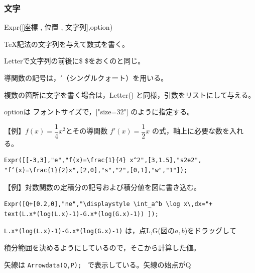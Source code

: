 \documentclass[papersize,a4paper,12pt,uplatex]{jsarticle}
\begin{document}
\subsubsection{文字}
\begin{description}

\vspace{\baselineskip}
\hypertarget{expr}{}
\item[関数]Expr([座標 , 位置 , 文字列],option)
\item[機能]\TeX 記法の文字列を与えて数式を書く。
\item[説明]Letterで文字列の前後に\$ \$をおくのと同じ。

導関数の記号は，$'$（シングルクォート）を用いる。

複数の箇所に文字を書く場合は，Letter() と同様，引数をリストにして与える。

optionは フォントサイズで，["size=32"] のように指定する。

\vspace{\baselineskip}
【例】$f(x)=\dfrac{1}{4} x^2$とその導関数 $f'(x)=\dfrac{1}{2} x$ の式，軸上に必要な数を入れる。
\begin{verbatim}
Expr([[-3,3],"e","f(x)=\frac{1}{4} x^2",[3,1.5],"s2e2",
"f‘(x)=\frac{1}{2}x",[2,0],"s","2",[0,1],"w","1"]);
\end{verbatim}
\vspace{\baselineskip}
\begin{center} \end{center}

【例】対数関数の定積分の記号および積分値を図に書き込む。
\begin{verbatim}
Expr([Q+[0.2,0],"ne","\displaystyle \int_a^b \log x\,dx="+
text(L.x*(log(L.x)-1)-G.x*(log(G.x)-1)) ]);
\end{verbatim}

 \verb|L.x*(log(L.x)-1)-G.x*(log(G.x)-1)| は，点L,G(図の$a,b$)をドラッグして
 
 積分範囲を決めるようにしているので，そこから計算した値。
 
 矢線は \verb|Arrowdata(Q,P); | で表示している。矢線の始点がQ
\vspace{\baselineskip}
\begin{center} \end{center}



\end{description}
\end{document}
